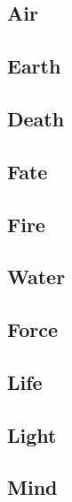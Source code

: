 \begin{multicols}{2}

\subsection{Air}


\subsection{Earth}


\subsection{Death}


\subsection{Fate}


\subsection{Fire}


\subsection{Water}


\subsection{Force}


\subsection{Life}


\subsection{Light}


\subsection{Mind}


\end{multicols}
